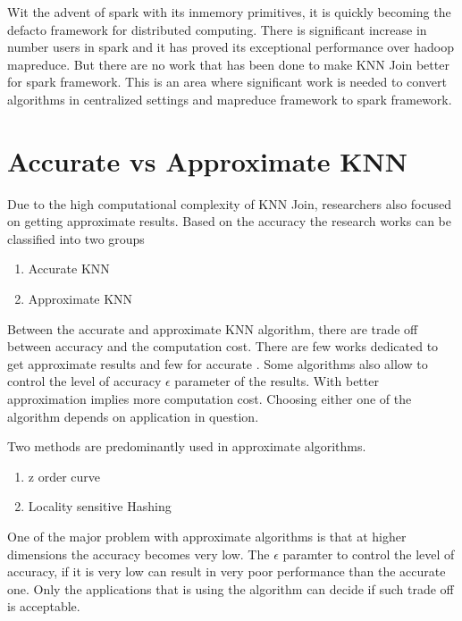 Wit the advent of spark with its inmemory primitives, it is quickly becoming the defacto framework for
distributed computing. There is significant increase in number users
in spark and it has proved its exceptional performance over
hadoop mapreduce. But there are no work that has been done to make
KNN Join better for spark framework. This is an area where significant
work is needed to convert algorithms in centralized settings and mapreduce framework  to spark
framework.

\section{Accurate vs Approximate KNN}

Due to the high computational complexity of KNN Join, researchers
also focused on getting approximate results. Based on the accuracy the
research works can be classified into two groups
\begin{enumerate}
\item Accurate KNN
\item Approximate KNN
\end{enumerate}


Between the accurate and approximate KNN algorithm, there are trade
off between accuracy and the computation cost. There are few
works dedicated to get approximate results \cite{stupar_rankreduceprocessing_2010}
\cite{zhang_efficient_2012} and few for accurate
\cite{jagadish_idistance:_2005} \cite{xia_gorder:_2004}
\cite{lu_efficient_2012}. Some algorithms also allow to control the
level of accuracy $\epsilon$  parameter of the results. With better approximation implies
more computation cost. Choosing either one of the algorithm depends on
application in question.

\medskip

Two methods are predominantly
used in approximate algorithms.
\begin{enumerate}
\item z order curve
\item Locality sensitive Hashing
\end{enumerate}

\medskip

One of the major problem with approximate algorithms is that at higher
dimensions the accuracy becomes very low. The $\epsilon$ paramter to
control the level of accuracy, if it is very low can result in very
poor performance than the accurate one. Only the applications that is
using the algorithm can decide if such trade off is acceptable.

